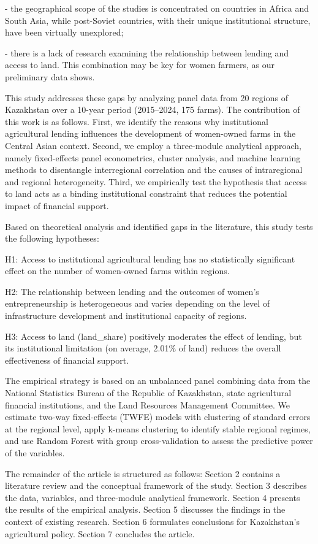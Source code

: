 - the geographical scope of the studies is concentrated on countries in
Africa and South Asia, while post-Soviet countries, with their unique
institutional structure, have been virtually unexplored;

- there is a lack of research examining the relationship between lending
and access to land. This combination may be key for women farmers, as
our preliminary data shows.

This study addresses these gaps by analyzing panel data from 20 regions
of Kazakhstan over a 10-year period (2015--2024, 175 farms). The
contribution of this work is as follows. First, we identify the reasons
why institutional agricultural lending influences the development of
women-owned farms in the Central Asian context. Second, we employ a
three-module analytical approach, namely fixed-effects panel
econometrics, cluster analysis, and machine learning methods to
disentangle interregional correlation and the causes of intraregional
and regional heterogeneity. Third, we empirically test the hypothesis
that access to land acts as a binding institutional constraint that
reduces the potential impact of financial support.

Based on theoretical analysis and identified gaps in the literature,
this study tests the following hypotheses:

H1: Access to institutional agricultural lending has no statistically
significant effect on the number of women-owned farms within regions.

H2: The relationship between lending and the outcomes of women's
entrepreneurship is heterogeneous and varies depending on the level of
infrastructure development and institutional capacity of regions.

H3: Access to land (land\_share) positively moderates the effect of
lending, but its institutional limitation (on average, 2.01\% of land)
reduces the overall effectiveness of financial support.

The empirical strategy is based on an unbalanced panel combining data
from the National Statistics Bureau of the Republic of Kazakhstan, state
agricultural financial institutions, and the Land Resources Management
Committee. We estimate two-way fixed-effects (TWFE) models with
clustering of standard errors at the regional level, apply k-means
clustering to identify stable regional regimes, and use Random Forest
with group cross-validation to assess the predictive power of the
variables.

The remainder of the article is structured as follows: Section 2
contains a literature review and the conceptual framework of the study.
Section 3 describes the data, variables, and three-module analytical
framework. Section 4 presents the results of the empirical analysis.
Section 5 discusses the findings in the context of existing research.
Section 6 formulates conclusions for Kazakhstan's agricultural policy.
Section 7 concludes the article.

